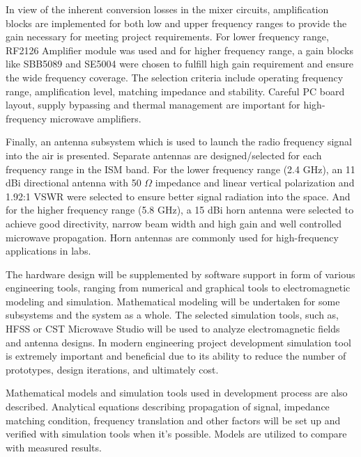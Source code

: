 \documentclass[12pt,a4paper]{report}
\begin{document}
	\vspace{0.5\baselineskip}
	
	In view of the inherent conversion losses in the mixer circuits, amplification blocks are implemented for both low and upper frequency ranges to provide the gain necessary for meeting project requirements. For lower frequency range, RF2126 Amplifier module was used and for higher frequency range, a gain blocks like SBB5089 and SE5004 were chosen to fulfill high gain requirement and ensure the wide frequency coverage. The selection criteria include operating frequency range, amplification level, matching impedance and stability. Careful PC board layout, supply bypassing and thermal management are important for high-frequency microwave amplifiers.
	
	\vspace{0.5\baselineskip}
	
	Finally, an antenna subsystem which is used to launch the radio frequency signal into the air is presented. Separate antennas are designed/selected for each frequency range in the ISM band. For the lower frequency range (2.4 GHz), an 11 dBi directional antenna with 50 $\Omega$ impedance and linear vertical polarization and 1.92:1 VSWR were selected to ensure better signal radiation into the space. And for the higher frequency range (5.8 GHz), a 15 dBi horn antenna were selected to achieve good directivity, narrow beam width and high gain and well controlled microwave propagation. Horn antennas are commonly used for high-frequency applications in labs.
	
	\vspace{0.5\baselineskip}
	
	The hardware design will be supplemented by software support in form of various engineering tools, ranging from numerical and graphical tools to electromagnetic modeling and simulation. Mathematical modeling will be undertaken for some subsystems and the system as a whole. The selected simulation tools, such as, HFSS or CST Microwave Studio will be used to analyze electromagnetic fields and antenna designs. In modern engineering project development simulation tool is extremely important and beneficial due to its ability to reduce the number of prototypes, design iterations, and ultimately cost.
	
	\vspace{0.5\baselineskip}
	
	Mathematical models and simulation tools used in development process are also described. Analytical equations describing propagation of signal, impedance matching condition, frequency translation and other factors will be set up and verified with simulation tools when it's possible. Models are utilized to compare with measured results.
	
\end{document}
